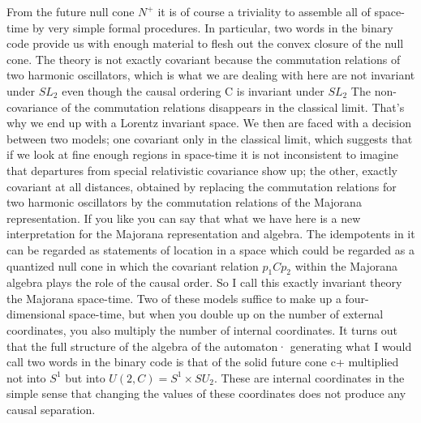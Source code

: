 From the future null cone $N^+$ it is of course a triviality to assemble all of
space-time by very simple formal procedures. In particular, two words in the
binary code provide us with enough material to flesh out the convex closure of
the null cone. The theory is not exactly covariant because the commutation
relations of two harmonic oscillators, which is what we are dealing with here are
not invariant under $SL_2$ even though the causal ordering C is invariant under
$SL_2$ The non-covariance of the commutation relations disappears in the
classical limit. That's why we end up with a Lorentz invariant space. We then are
faced with a decision between two models; one covariant only in the classical
limit, which suggests that if we look at fine enough regions in space-time it is
not inconsistent to imagine that departures from special relativistic covariance
show up; the other, exactly covariant at all distances, obtained by replacing the
commutation relations for two harmonic oscillators by the commutation relations
of the Majorana representation. If you like you can say that what we have here is
a new interpretation for the Majorana representation and algebra. The idempotents
in it can be regarded as statements of location in a space which could be
regarded as a quantized null cone in which the covariant relation $p_1 Cp_2$
within the Majorana algebra plays the role of the causal order. So I call this
exactly invariant theory the Majorana space-time. Two of these models suffice to
make up a four-dimensional space-time, but when you double up on the number of
external coordinates, you also multiply the number of internal coordinates. It
turns out that the full structure of the algebra of the automaton· generating
what I would call two words in the binary code is that of the solid future cone
c+ multiplied not into $S^1$ but into
$U(2,C)=S^1 \times SU_2$.
These are internal coordinates in the simple sense that changing the values of
these coordinates does not produce any causal separation.

